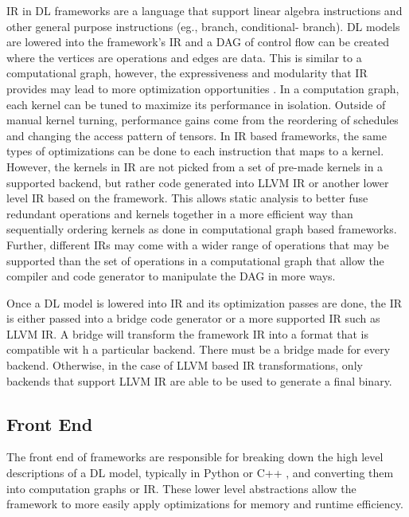 IR in DL frameworks are a language that support linear algebra instructions and
other general purpose instructions (eg., branch, conditional- branch). DL
models are lowered into the framework's IR and a DAG of control flow
\cite{nGraph} can be created where the vertices are operations and edges are
data. This is similar to a computational graph, however, the expressiveness and
modularity that IR provides may lead to more optimization opportunities
\cite{DLVM}. In a computation graph, each kernel can be tuned to maximize its
performance in isolation. Outside of manual kernel turning, performance gains
come from the reordering of schedules and changing the access pattern of
tensors.  In IR based frameworks, the same types of optimizations can be done
to each instruction that maps to a kernel. However, the kernels in IR are not
picked from a set of pre-made kernels in a supported backend, but rather code
generated into LLVM IR or another lower level IR based on the framework. This
allows static analysis to better fuse redundant operations and kernels together
in a more efficient way than sequentially ordering kernels as done in
computational graph based frameworks. Further, different IRs may come with
a wider range of operations that may be supported than the set of operations in
a computational graph that allow the compiler and code generator to manipulate
the DAG in more ways.

Once a DL model is lowered into IR and its optimization passes are done, the IR
is either passed into a bridge code generator or a more supported IR such as
LLVM IR. A bridge will transform the framework IR into a format that is
compatible wit h a particular backend. There must be a bridge made for every
backend. Otherwise, in the case of LLVM based IR transformations, only
backends that support LLVM IR are able to be used to generate a final binary.


\subsection{Front End}
The front end of frameworks are responsible for breaking down the high level
descriptions of a DL model, typically in Python or C++ \cite{tensorflow}, and
converting them into computation graphs or IR. These lower level abstractions
allow the framework to more easily apply optimizations for memory and runtime
efficiency.

